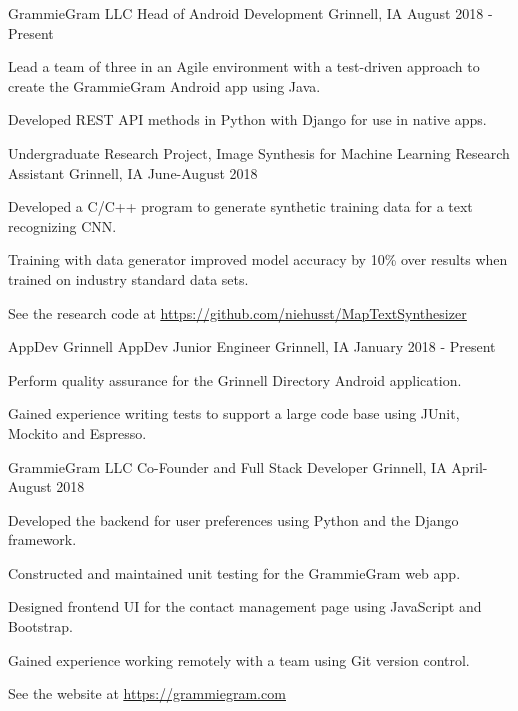 \documentclass[12pt, a4paper]{awesome-cv}
\begin{document}
\begin{cventries}

  \cventry
    {GrammieGram LLC}
    {Head of Android Development}
    {Grinnell, IA}
    {August 2018 - Present}
    {
      \begin{cvitems}
        \item {Lead a team of three in an Agile environment with a test-driven approach to create the GrammieGram Android app using Java.}
	\item {Developed REST API methods in Python with Django for use in native apps.}
      \end{cvitems}
    }


  \cventry
    {Undergraduate Research Project, Image Synthesis for Machine Learning}
    {Research Assistant}
    {Grinnell, IA}
    {June-August 2018}
    {
      \begin{cvitems}
        \item {Developed a C/C++ program to generate synthetic training data for a text recognizing CNN.}
        \item{Training with data generator improved model accuracy by 10\% over results when trained on industry standard data sets.}
	\item{See the research code at \underline{\href{https://github.com/niehusst/MapTextSynthesizer}{https://github.com/niehusst/MapTextSynthesizer}}}
      \end{cvitems}
    }


  \cventry
    {AppDev Grinnell}
    {AppDev Junior Engineer}
    {Grinnell, IA}
    {January 2018 - Present}
    {
      \begin{cvitems}
        \item {Perform quality assurance for the Grinnell Directory Android application.}
	\item {Gained experience writing tests to support a large code base using JUnit, Mockito and Espresso.}
      \end{cvitems}
    }


  \cventry
    {GrammieGram LLC}
    {Co-Founder and Full Stack Developer}
    {Grinnell, IA}
    {April-August 2018}
    {
      \begin{cvitems}
        \item {Developed the backend for user preferences using Python and the Django framework.}
        \item {Constructed and maintained unit testing for the GrammieGram web app.}
        \item {Designed frontend UI for the contact management page using JavaScript and Bootstrap.}
        \item {Gained experience working remotely with a team using Git version control.}
	 \item {See the website at \underline{\href{https://grammiegram.com}{https://grammiegram.com}}}
      \end{cvitems}
    }



\end{cventries}
\end{document}
